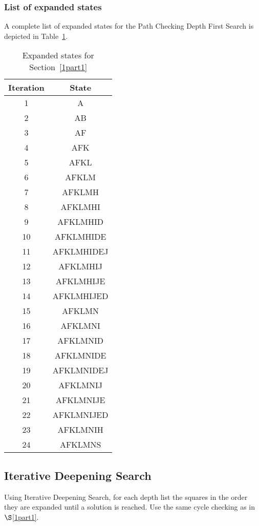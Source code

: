 \documentclass[12pt,letterpaper,titlepage]{article}
\begin{document}
\subsubsection[Answer]{List of expanded states}
A complete list of expanded states for the Path Checking Depth First Search is depicted in Table~\ref{tab:1_1ans}.
\begin{table}[htbp]
  \centering
  \caption{Expanded states for Section~\ref{1part1}}
    \begin{tabular}{cc}
    \toprule
    Iteration & State \\
    \midrule
    1     & A \\ \midrule
    2     & AB \\ \midrule
    3     & AF \\ \midrule
    4     & AFK \\ \midrule
    5     & AFKL \\ \midrule
    6     & AFKLM \\ \midrule
    7     & AFKLMH \\ \midrule
    8     & AFKLMHI \\ \midrule
    9     & AFKLMHID \\ \midrule
    10    & AFKLMHIDE \\ \midrule
    11    & AFKLMHIDEJ \\ \midrule
    12    & AFKLMHIJ \\ \midrule
    13    & AFKLMHIJE \\ \midrule
    14    & AFKLMHIJED \\ \midrule
    15    & AFKLMN \\ \midrule
    16    & AFKLMNI \\ \midrule
    17    & AFKLMNID \\ \midrule
    18    & AFKLMNIDE \\ \midrule
    19    & AFKLMNIDEJ \\ \midrule
    20    & AFKLMNIJ \\ \midrule
    21    & AFKLMNIJE \\ \midrule
    22    & AFKLMNIJED \\ \midrule
    23    & AFKLMNIH \\ \midrule
    24    & AFKLMNS \\ \midrule
    \end{tabular}%
  \label{tab:1_1ans}%
\end{table}%
\subsection[Part 2]{Iterative Deepening Search}
\label{1part2}
Using Iterative Deepening Search, for each depth list the squares in the order they are expanded until a solution is reached. Use the same cycle checking as in $\S$\ref{1part1}.
\end{document}
